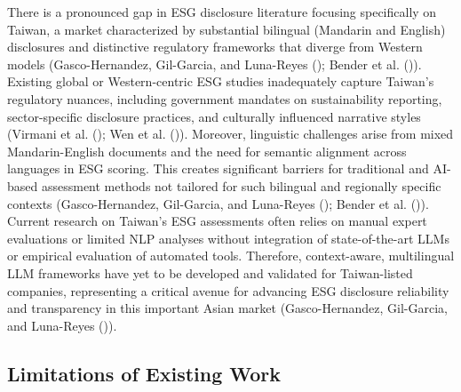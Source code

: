 \documentclass[
  12pt,
]{article}
\begin{document}
There is a pronounced gap in ESG disclosure literature focusing
specifically on Taiwan, a market characterized by substantial bilingual
(Mandarin and English) disclosures and distinctive regulatory frameworks
that diverge from Western models (Gasco-Hernandez, Gil-Garcia, and
Luna-Reyes (); Bender et al.
()). Existing global or Western-centric
ESG studies inadequately capture Taiwan's regulatory nuances, including
government mandates on sustainability reporting, sector-specific
disclosure practices, and culturally influenced narrative styles
(Virmani et al. (); Wen et al.
()). Moreover, linguistic challenges arise
from mixed Mandarin-English documents and the need for semantic
alignment across languages in ESG scoring. This creates significant
barriers for traditional and AI-based assessment methods not tailored
for such bilingual and regionally specific contexts (Gasco-Hernandez,
Gil-Garcia, and Luna-Reyes ();
Bender et al. ()). Current research on
Taiwan's ESG assessments often relies on manual expert evaluations or
limited NLP analyses without integration of state-of-the-art LLMs or
empirical evaluation of automated tools. Therefore, context-aware,
multilingual LLM frameworks have yet to be developed and validated for
Taiwan-listed companies, representing a critical avenue for advancing
ESG disclosure reliability and transparency in this important Asian
market (Gasco-Hernandez, Gil-Garcia, and Luna-Reyes
()).

\subsection{Limitations of Existing
Work}\label{limitations-of-existing-work}
\end{document}
